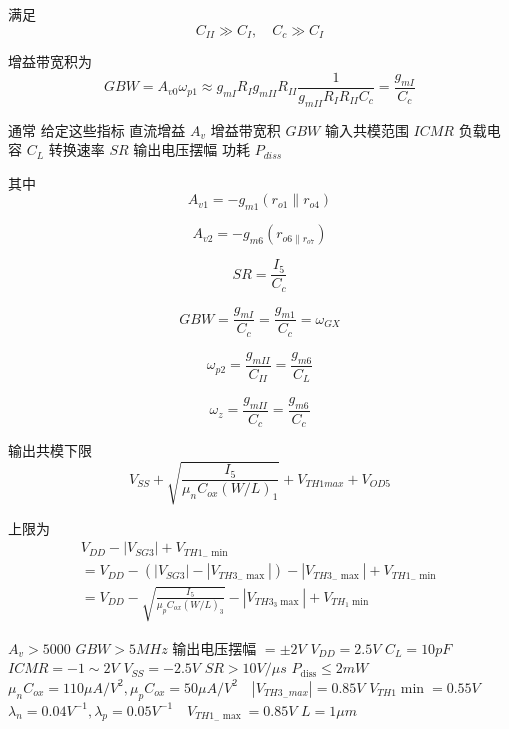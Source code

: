 \documentclass[cn,11pt,chinese,black,simple]{../elegantbook}
\begin{document}
满足 \[ C_{I I} \gg C_{I}, \quad C_{c} \gg C_{I}\]

增益带宽积为 \[G B W=A_{v 0} \omega_{p 1} \approx g_{m I} R_{I} g_{m I I} R_{I I} \frac{1}{g_{m I I} R_{I} R_{I I} C_{c}}=\frac{g_{m I}}{C_{c}}\]


通常
给定这些指标
直流增益 \(A_v\)
增益带宽积 \(GBW\)
输入共模范围 \(ICMR\)
负载电容 \(C_L\)
转换速率 \(SR\)
输出电压摆幅
功耗 \(P_{diss}\)

其中 \[A_{v1} = -g_{m1}(r_{o1} \| r_{o4})\]

\[A_{v2} = -g_{m6} (r_{o6 \| r_{o7}})\]

\[SR = \dfrac{I_5}{C_c}\]

\[GBW = \dfrac{g_{mI}}{C_c} = \dfrac{g_{m1}}{C_c} = \omega_{GX}\]

\[\omega_{p2} = \dfrac{g_{mII}}{C_{II}} = \dfrac{g_{m6}}{C_L}\]

\[\omega_z = \dfrac{g_{mII}}{C_c} = \dfrac{g_{m6}}{C_c}\]

输出共模下限 
\[V_{SS} + \sqrt{\dfrac{I_5}{\mu_n C_{ox} (W/L)_1}} + V_{TH1max} + V_{OD5}\]

上限为 \[\begin{array}{l}
    V_{D D}-\left|V_{S G 3}\right|+V_{T H 1_{-} \min } \\
    =V_{D D}-\left(\left|V_{S G 3}\right|-\left|V_{T H 3_{-} \max }\right|\right)-\left|V_{T H 3_{-} \max }\right|+V_{T H 1_{-} \min } \\
    =V_{D D}-\sqrt{\frac{I_{5}}{\mu_{p} C_{o x}(W / L)_{3}}}-\left|V_{T H 3_{3} \max }\right|+V_{T H_{1} \min }
    \end{array}\]

\begin{example}
    \(A_{v}>5000\)
\(G B W>5 M H z\)
输出电压摆幅 \(=\pm 2 V\)
\(V_{D D}=2.5 V\)
\(C_{L}=10 p F\)
\(I C M R=-1 \sim 2 V\)
\(V_{S S}=-2.5 V\)
\(S R>10 V / \mu s\)
\(P_{\text {diss}} \leq 2 m W\)
\(\mu_{n} C_{o x}=110 \mu A / V^{2}, \mu_{p} C_{o x}=50 \mu A / V^{2} \quad\left|V_{T H 3_{-} m a x}\right|=0.85 V\)
\(V_{T H 1} \min =0.55 V\)
\(\lambda_{n}=0.04 V^{-1}, \lambda_{p}=0.05 V^{-1} \quad V_{T H 1_{-} \max }=0.85 V\)
\(L=1 \mu m\)
\end{example}
\end{document}
